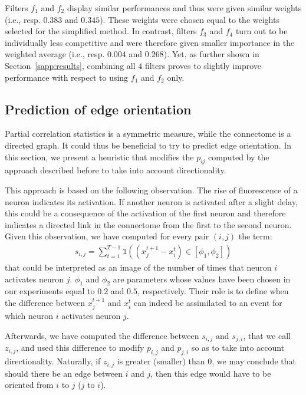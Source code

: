 \documentclass[wcp]{jmlr}
\begin{document}
Filters $f_1$ and $f_2$ display similar performances and thus were given similar
weights (i.e., resp. $0.383$ and $0.345$). These weights were chosen equal to the weights selected for the simplified method. In contrast, filters $f_3$
and $f_4$ turn out to be individually less competitive and were therefore given
smaller importance in the weighted average (i.e., resp. $0.004$ and $0.268$). Yet, as further shown in
Section~\ref{sapp:results}, combining all $4$ filters proves to slightly
improve performance with respect to using $f_1$ and $f_2$ only.

\subsection{Prediction of edge orientation}
\label{sapp:connectome}

Partial  correlation  statistics is  a  symmetric  measure, while  the
connectome is a directed graph. It  could thus be beneficial to try to
predict edge orientation. In this section, we present a heuristic that
modifies the  $p_{ij}$ computed  by the  approach described  before to
take into account directionality.

This approach is based on the following
observation. The rise of fluorescence of a neuron indicates its
activation. If another neuron is activated after a slight delay, this
could be a consequence of the activation of the first neuron and
therefore indicates a directed link in the connectome from the first to
the second neuron.  Given this observation, we have computed for every
pair $(i,j)$ the term:
\begin{align}
s_{i,j} = \sum_{t=1}^{T - 1} \mathbb{1}((x_j^{t+1} - x_i^t) \in \left[\phi_1, \phi_2\right])
\end{align}
that could be interpreted as an image of the  number of times
that neuron $i$ activates neuron $j$. $\phi_1$ and $\phi_2$ are
parameters whose values have been chosen in our experiments equal to
$0.2$ and $0.5$, respectively. Their role is to
define when the difference between $x_j^{t+1}$  and $x_i^t$ can
indeed be assimilated to an event for which neuron $i$ activates neuron
$j$.

Afterwards, we have computed the difference between $s_{i,j}$ and
$s_{j,i}$, that we call $z_{i,j}$, and used this difference to modify  $p_{i,j}$ and
$p_{j,i}$ so as to take into account directionality. Naturally, if
$z_{i,j}$ is greater  (smaller) than $0$, we may conclude that should there  be an
edge between $i$ and $j$, then this edge would have to be oriented
from $i$ to $j$ ($j$ to $i$).
\end{document}

